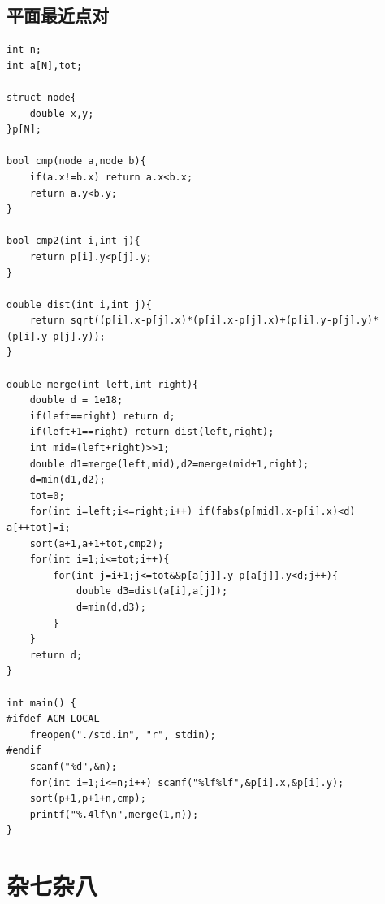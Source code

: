 \documentclass[twoside]{article}
\begin{document}
\subsection{平面最近点对}
\begin{lstlisting}
int n;
int a[N],tot;

struct node{
    double x,y;
}p[N];

bool cmp(node a,node b){
    if(a.x!=b.x) return a.x<b.x;
    return a.y<b.y;
}

bool cmp2(int i,int j){
    return p[i].y<p[j].y;
}

double dist(int i,int j){
    return sqrt((p[i].x-p[j].x)*(p[i].x-p[j].x)+(p[i].y-p[j].y)*(p[i].y-p[j].y));
}

double merge(int left,int right){
    double d = 1e18;
    if(left==right) return d;
    if(left+1==right) return dist(left,right);
    int mid=(left+right)>>1;
    double d1=merge(left,mid),d2=merge(mid+1,right);
    d=min(d1,d2);
    tot=0;
    for(int i=left;i<=right;i++) if(fabs(p[mid].x-p[i].x)<d) a[++tot]=i;
    sort(a+1,a+1+tot,cmp2);
    for(int i=1;i<=tot;i++){
        for(int j=i+1;j<=tot&&p[a[j]].y-p[a[j]].y<d;j++){
            double d3=dist(a[i],a[j]);
            d=min(d,d3);
        }
    }
    return d;
}

int main() {
#ifdef ACM_LOCAL
    freopen("./std.in", "r", stdin);
#endif
    scanf("%d",&n);
    for(int i=1;i<=n;i++) scanf("%lf%lf",&p[i].x,&p[i].y);
    sort(p+1,p+1+n,cmp);
    printf("%.4lf\n",merge(1,n));
}
\end{lstlisting}
\clearpage\section{杂七杂八}
\end{document}
